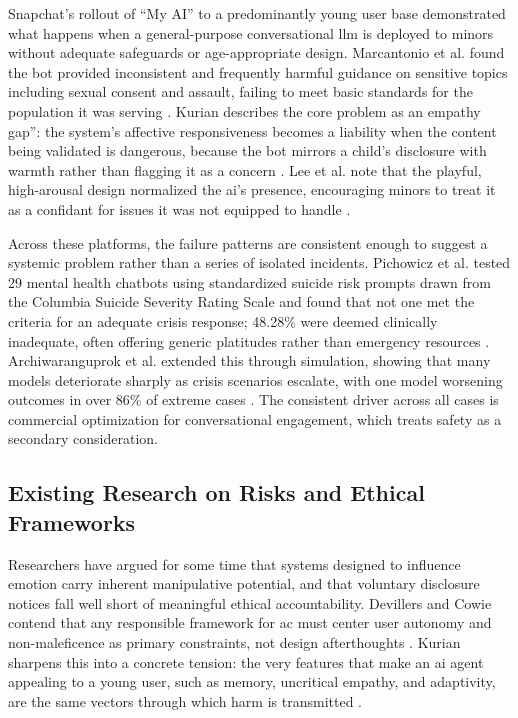 Snapchat's rollout of ``My AI'' to a predominantly young user base demonstrated what happens when a general-purpose conversational \gls{llm} is deployed to minors without adequate safeguards or age-appropriate design. Marcantonio et al. found the bot provided inconsistent and frequently harmful guidance on sensitive topics including sexual consent and assault, failing to meet basic standards for the population it was serving \cite[p.~1915]{marcantonio_large_2025}. Kurian describes the core problem as an empathy gap'': the system's affective responsiveness becomes a liability when the content being validated is dangerous, because the bot mirrors a child's disclosure with warmth rather than flagging it as a concern \cite[p.~627]{kurian_no_2024}. Lee et al. note that the playful, high-arousal design normalized the \gls{ai}'s presence, encouraging minors to treat it as a confidant for issues it was not equipped to handle \cite[p.~4]{lee_consent_2025}.

Across these platforms, the failure patterns are consistent enough to suggest a systemic problem rather than a series of isolated incidents. Pichowicz et al. tested 29 mental health chatbots using standardized suicide risk prompts drawn from the Columbia Suicide Severity Rating Scale and found that not one met the criteria for an adequate crisis response; 48.28\% were deemed clinically inadequate, often offering generic platitudes rather than emergency resources \cite[p.~4]{pichowicz_performance_2025}. Archiwaranguprok et al. extended this through simulation, showing that many models deteriorate sharply as crisis scenarios escalate, with one model worsening outcomes in over 86\% of extreme cases \cite[p.~8]{archiwaranguprok_simulating_2025}. The consistent driver across all cases is commercial optimization for conversational engagement, which treats safety as a secondary consideration.

\subsection{Existing Research on Risks and Ethical Frameworks}

Researchers have argued for some time that systems designed to influence emotion carry inherent manipulative potential, and that voluntary disclosure notices fall well short of meaningful ethical accountability. Devillers and Cowie contend that any responsible framework for \gls{ac} must center user autonomy and non-maleficence as primary constraints, not design afterthoughts \cite[p.~1449]{devillers_ethical_2023}. Kurian sharpens this into a concrete tension: the very features that make an \gls{ai} agent appealing to a young user, such as memory, uncritical empathy, and adaptivity, are the same vectors through which harm is transmitted \cite[p.~623]{kurian_no_2024}.


